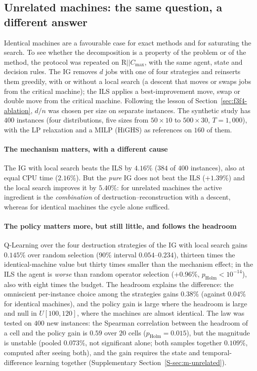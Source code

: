 \subsection{Unrelated machines: the same question, a different answer}
\label{sec:unrelated}

Identical machines are a favourable case for exact methods and for saturating the search. To see whether the decomposition is a property of the problem or of the method, the protocol was repeated on
$\mathrm{R}||C_{\max}$, with the same agent, state and decision rules. The IG removes $d$ jobs with one of four strategies and reinserts them greedily, with or without a local search (a descent that moves or
swaps jobs from the critical machine); the ILS applies a best-improvement move, swap or double move from the critical machine. Following the lesson of Section~\ref{sec:f3f4-ablation}, $d/n$ was chosen per size on
separate instances. The synthetic study has $400$ instances (four distributions, five sizes from $50\times10$ to $500\times30$, $T=1{,}000$), with the LP relaxation and a MILP (HiGHS) as references on $160$ of them.

\paragraph{The mechanism matters, with a different cause}
The IG with local search beats the ILS by $4.16\%$ ($384$ of $400$ instances), also at equal CPU time ($2.16\%$). But the \emph{pure} IG does not beat the ILS ($+1.39\%$) and the local search improves it by
$5.40\%$: for unrelated machines the active ingredient is the \emph{combination} of destruction--reconstruction with a descent, whereas for identical machines the cycle alone sufficed.

\paragraph{The policy matters more, but still little, and follows the headroom}
Q-Learning over the four destruction strategies of the IG with local search gains $0.145\%$ over random selection (90\% interval $0.054$--$0.234$), thirteen times the identical-machine value
but thirty times smaller than the mechanism effect; in the ILS the agent is \emph{worse} than random operator selection ($+0.96\%$, $p_{\mathrm{Holm}}<10^{-14}$), also with eight times the budget. The headroom explains the difference:
the omniscient per-instance choice among the strategies gains $0.38\%$ (against $0.04\%$ for identical machines), and the policy gain is large where the headroom is large and null in $U[100,120]$, where the machines
are almost identical. The law was tested on $400$ new instances: the Spearman correlation between the headroom of a cell and the policy gain is $0.59$ over $20$ cells ($p_{\mathrm{Holm}}=0.015$), but the magnitude is unstable
(pooled $0.073\%$, not significant alone; both samples together $0.109\%$, computed after seeing both), and the gain requires the state and temporal-difference learning together (Supplementary Section~\ref{S-sec:m-unrelated}).

